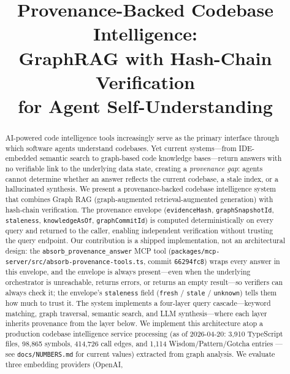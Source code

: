 \documentclass[conference]{IEEEtran}
\begin{document}
\title{Provenance-Backed Codebase Intelligence:\\GraphRAG with Hash-Chain Verification\\for Agent Self-Understanding}

\author{
}

\maketitle

\begin{abstract}
AI-powered code intelligence tools increasingly serve as the primary
interface through which software agents understand codebases. Yet current
systems---from IDE-embedded semantic search to graph-based code
knowledge bases---return answers with no verifiable link to the
underlying data state, creating a \emph{provenance gap}: agents cannot
determine whether an answer reflects the current codebase, a stale
index, or a hallucinated synthesis. We present a provenance-backed
codebase intelligence system that combines Graph RAG (graph-augmented
retrieval-augmented generation) with hash-chain verification. The
provenance envelope (\texttt{evidenceHash}, \texttt{graphSnapshotId},
\texttt{staleness}, \texttt{knowledgeAsOf}, \texttt{graphCommitId}) is
computed deterministically on every query and returned to the caller,
enabling independent verification without trusting the query endpoint.
Our contribution is a shipped implementation, not an architectural
design: the \texttt{absorb\_provenance\_answer} MCP tool
(\texttt{packages/mcp-server/src/absorb-provenance-tools.ts}, commit
\texttt{66294fc8}) wraps every answer in this envelope, and the envelope
is always present---even when the underlying orchestrator is unreachable,
returns errors, or returns an empty result---so verifiers can always
check it; the envelope's \texttt{staleness} field (\texttt{fresh} /
\texttt{stale} / \texttt{unknown}) tells them how much to trust it. The
system implements a four-layer query cascade---keyword matching, graph
traversal, semantic search, and LLM synthesis---where each layer inherits
provenance from the layer below. We implement this architecture atop a
production codebase intelligence service processing (as of 2026-04-20:
3,910 TypeScript files, 98,865 symbols, 414,726 call edges, and 1,114
Wisdom/Pattern/Gotcha entries --- see \texttt{docs/NUMBERS.md} for current values) extracted
from graph analysis. We evaluate three embedding providers (OpenAI,

\end{abstract}
\end{document}
